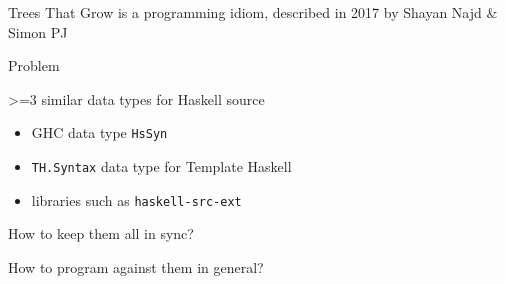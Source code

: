 \begin{frame}
\begin{center}
Trees That Grow is a programming idiom, described in 2017 by Shayan Najd \& Simon PJ\cite{najd2016trees}
\end{center}
\end{frame}

\begin{frame}
\begin{center}
Problem

>=3 similar data types for Haskell source

\begin{itemize}
\item GHC data type \lstinline{HsSyn}
\item \lstinline{TH.Syntax} data type for Template Haskell
\item libraries such as \lstinline{haskell-src-ext}
\end{itemize}
\end{center}
\end{frame}

\begin{frame}
\begin{center}
How to keep them all in sync?

How to program against them in general?
\end{center}
\end{frame}

